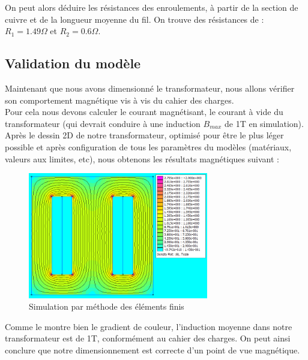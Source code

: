 On peut alors déduire les résistances des enroulements, à partir de la section de cuivre et de la longueur moyenne du fil. On trouve des résistances de : $R_1 = 1.49\Omega$ et $R_2 = 0.6\Omega$.\\

\newpage
\subsection{Validation du modèle}
Maintenant que nous avons dimensionné le transformateur, nous allons vérifier son comportement magnétique vis à vis du cahier des charges.\\
Pour cela nous devons calculer le courant magnétisant, le courant à vide du transformateur (qui devrait conduire à une induction $B_{max}$ de 1T en simulation).\\

Après le dessin 2D de notre transformateur, optimisé pour être le plus léger possible et après configuration de tous les paramètres du modèles (matériaux, valeurs aux limites, etc), nous obtenons les résultats magnétiques suivant :\\

\begin{figure}[h]
	\begin{center}
	\includegraphics[width=0.7\textwidth]{images/TP1_FEMM_validation}
	\caption{Simulation par méthode des éléments finis}\label{img:FEMMvalidation}
	\end{center}
\end{figure}
\FloatBarrier 

Comme le montre bien le gradient de couleur, l'induction moyenne dans notre transformateur est de 1T, conformément au cahier des charges. On peut ainsi conclure que notre dimensionnement est correcte d'un point de vue magnétique.\\